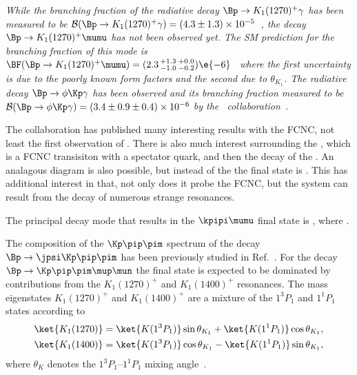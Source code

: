 \emph{
While the branching fraction of the radiative decay $\Bp\to K_1(1270)^+\gamma$ has been measured to
be ${\cal B}(\Bp\to K_1(1270)^+\gamma)=(4.3\pm 1.3)\times 10^{-5}$~\cite{Yang:2004as}, the decay
$\Bp\to K_1(1270)^+\mumu$ has not been observed yet.
The SM prediction for the branching fraction of this mode is $\BF(\Bp\to K_1(1270)^+\mumu) =
(2.3\,^{+1.3}_{-1.0}\,^{+0.0}_{-0.2})\e{-6}$~\cite{Hatanaka:2008gu} where the first uncertainty is
due to the poorly known form factors and the second due to $\theta_{K_1}$.
The radiative decay $\Bp\to\phi \Kp\gamma$ has been observed and its branching fraction measured to
be ${\cal B}(\Bp\to\phi \Kp\gamma)=(3.4\pm 0.9 \pm 0.4)\times 10^{-6}$ by the \belle\
collaboration~\cite{Drutskoy:2003xh}.
}






The \lhcb collaboration has published many interesting results with the  FCNC, not
least the first observation of \decay{\Bs}{\mumu}.
There is also much interest surrounding the \decay{\Bd}{\Kstar\mumu}, which is a  FCNC
transisiton with a spectator quark, and then the decay of the \Kstar.
An analagous diagram is also possible, but instead of the \Kstar the final state is \kpipi.
This has additional interest in that, not only does it probe the FCNC, but the \kpipi system can
result from the decay of numerous strange resonances.

The principal decay mode that results in the $\kpipi\mumu$ final state is
\decay{\Bp}{K_1(1270)^+\mumu}, where \decay{K_1(1270)}{\kpipi}.

The composition of the $\Kp\pip\pim$ spectrum of the decay $\Bp\to\jpsi\Kp\pip\pim$ has been
previously studied in Ref.~\cite{Guler:2010if}.
For the decay $\Bp\to\Kp\pip\pim\mup\mun$ the final state is expected to be dominated by
contributions from the $K_1(1270)^+$ and $K_1(1400)^+$ resonances.
The mass eigenstates $K_1(1270)^+$ and $K_1(1400)^+$ are a mixture of the $1^3P_1$ and $1^1P_1$
states according to
\begin{align}
  \ket{K_1(1270)} &= \ket{K(1^3P_1)}\sin\theta_{K_1} + \ket{K(1^1P_1)}\cos\theta_{K_1},\nonumber\\
  \ket{K_1(1400)} &= \ket{K(1^3P_1)}\cos\theta_{K_1} - \ket{K(1^1P_1)}\sin\theta_{K_1},%
  \label{eq:k1mixing}
\end{align}
where $\theta_K$ denotes the $1^3P_1\text{--}1^1P_1$ %
mixing angle~\cite{Hatanaka:2008gu}.

